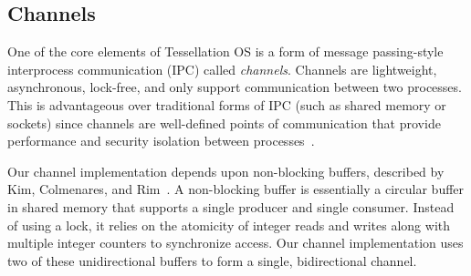 \documentclass[letterpaper,twocolumn,11pt]{article}
\begin{document}
%
%

\subsection{Channels}

One of the core elements of Tessellation OS is a form of message passing-style interprocess communication (IPC) called \emph{channels}.
Channels are lightweight, asynchronous, lock-free, and only support communication between two processes. This is advantageous over traditional forms of IPC (such as shared memory or sockets) since channels are well-defined points of communication that provide performance and security isolation between processes~\cite{tessellation-hotpar10}.

Our channel implementation depends upon non-blocking buffers, described by Kim, Colmenares, and Rim~\cite{Kim:2007:EAN:1260991.1261857}. A non-blocking buffer is essentially a circular buffer in shared memory that supports a single producer and single consumer. Instead of using a lock, it relies on the atomicity of integer reads and writes along with multiple integer counters to synchronize access. Our channel implementation uses two of these unidirectional buffers to form a single, bidirectional channel.
\end{document}
